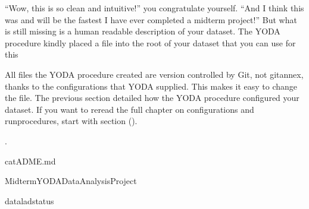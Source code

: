 \sphinxAtStartPar
“Wow, this is so clean and intuitive!” you congratulate yourself. “And I think
this was and will be the fastest I have ever completed a midterm project!”
But what is still missing is a human readable description of your dataset.
The YODA procedure kindly placed a  file into the root of your
dataset that you can use for this%
\begin{footnote}\sphinxAtStartFootnote
All  files the YODA procedure created are
version controlled by Git, not git\sphinxhyphen{}annex, thanks to the
configurations that YODA supplied. This makes it easy to change the
 file. The previous section detailed how the YODA procedure
configured your dataset. If you want to re\sphinxhyphen{}read the full chapter on
configurations and run\sphinxhyphen{}procedures, start with section {\hyperref[\detokenize{basics/101-122-config:config}]{}} ().
%
\end{footnote}.

\begin{sphinxVerbatim}[commandchars=\\\{\}]
catADME.md

MidtermYODADataAnalysisProject



\end{sphinxVerbatim}

\begin{sphinxVerbatim}[commandchars=\\\{\}]
dataladstatus
\end{sphinxVerbatim}

